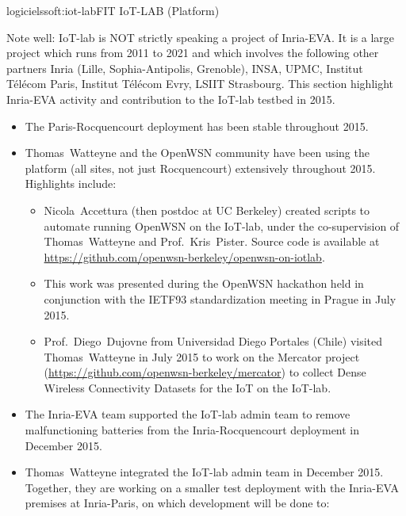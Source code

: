\documentclass{ra2016}
\begin{document}
\begin{module}{logiciels}{soft:iot-lab}{FIT IoT-LAB (Platform)} 

\begin{participants}
\end{participants}

Note well: IoT-lab is NOT strictly speaking a project of Inria-EVA. It is a large project which runs from 2011 to 2021 and which involves the following other partners Inria (Lille, Sophia-Antipolis, Grenoble), INSA, UPMC, Institut T\'el\'ecom Paris, Institut T\'el\'ecom Evry, LSIIT Strasbourg. This section highlight Inria-EVA activity and contribution to the IoT-lab testbed in 2015.

\begin{itemize}
    \item The Paris-Rocquencourt deployment has been stable throughout 2015.
    \item Thomas~Watteyne and the OpenWSN community have been using the platform (all sites, not just Rocquencourt) extensively throughout 2015. Highlights include:
    \begin{itemize}
        \item Nicola~Accettura (then postdoc at UC Berkeley) created scripts to automate running OpenWSN on the IoT-lab, under the co-supervision of Thomas~Watteyne and Prof.~Kris~Pister.
            Source code is available at \url{https://github.com/openwsn-berkeley/openwsn-on-iotlab}.
        \item This work was presented during the OpenWSN hackathon held in conjunction with the IETF93 standardization meeting in Prague in July 2015.
        \item Prof.~Diego~Dujovne from Universidad Diego Portales (Chile) visited Thomas~Watteyne in July 2015 to work on the Mercator project (\url{https://github.com/openwsn-berkeley/mercator}) to collect Dense Wireless Connectivity Datasets for the IoT on the IoT-lab.
    \end{itemize}
    \item The Inria-EVA team supported the IoT-lab admin team to remove malfunctioning batteries from the Inria-Rocquencourt deployment in December 2015.
    \item Thomas~Watteyne integrated the IoT-lab admin team in December 2015. Together, they are working on a smaller test deployment with the Inria-EVA premises at Inria-Paris, on which development will be done to:

\end{itemize}
\end{module}
\end{document}
